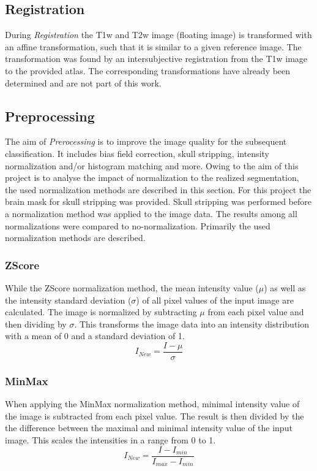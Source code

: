 \documentclass[article]{IEEEtran}
\begin{document}
\subsection{Registration}
	During {\itshape Registration} the T1w and T2w image (floating image) is transformed with an affine transformation, such that it is similar to a given reference image.
	The transformation was found by an intersubjective registration from the T1w image to the provided atlas. The corresponding transformations have already been determined
	and are not part of this work. 	
	
\subsection{Preprocessing}
	The aim of {\itshape Prerocessing} is to improve the image quality for the subsequent classification. It includes bias field correction, skull stripping, intensity normalization and/or histogram matching and more.
	Owing to the aim of this project is to analyse the impact of normalization to the realized segmentation, the used normalization methods are described in this section.
	For this project the brain mask for skull stripping was provided. Skull stripping was performed before a normalization method was applied to the image data. The results among all normalizations were compared to no-normalization. Primarily the used normalization methods are described.\cite{reinhold2018} \smallskip
		
	\subsubsection{ZScore}
	While the ZScore normalization method, the mean intensity value ($\mu$) as well as the intensity standard deviation ($\sigma$) of all pixel values of the input image are calculated. 
	The image is normalized by subtracting $\mu$ from each pixel value and then dividing by $\sigma$.
	This transforms the image data into an intensity distribution with a mean of 0 and a standard deviation of 1.
		\begin{equation}\label{ZScore}
			I_{New} = \frac{I - \mu}{\sigma}
		\end{equation}
			
	\subsubsection{MinMax}
	When applying the MinMax normalization method, minimal intensity value of the image is subtracted from each pixel value.
	The result is then divided by the the difference between the maximal and minimal intensity value of the input image.
	This scales the intensities in a range from 0 to 1. 
		\begin{equation}
			I_{New} = \frac{I - I_{min}}{I_{max} - I_{min}}
		\end{equation}
		
\end{document}
